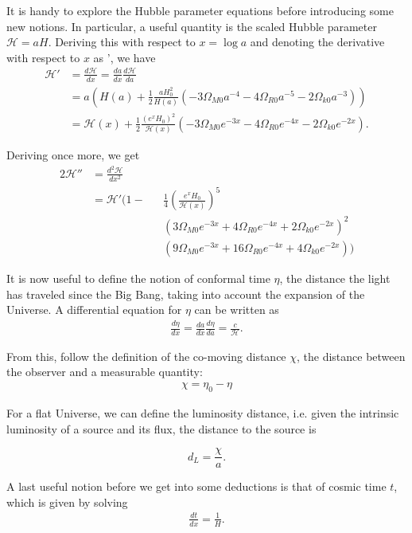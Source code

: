 \documentclass{aa}
\begin{document}
It is handy to explore the Hubble parameter equations before introducing some new notions. In particular, a useful quantity is the scaled Hubble parameter $\mathcal H = aH$. Deriving this with respect to $x = \log a$ and denoting the derivative with respect to $x$ as ', we have
\begin{align}
    \mathcal H' &= \frac{d\mathcal H}{dx} = \frac{da}{dx}\frac{d\mathcal H}{da}\\ 
    &= a\left( H(a) + \frac{1}{2}\frac{aH_0^2}{ H(a)} (-3\Omega_{M0} a^{-4} - 4\Omega_{R0}a^{-5}-2\Omega_{k0}a^{-3})\right)\\
    &= \mathcal H(x) +\frac{1}{2}\frac{(e^xH_0)^2}{\mathcal H(x)}(-3\Omega_{M0} e^{-3x} - 4 \Omega_{R0}e^{-4x}-2\Omega_{k0}e^{-2x}).
\end{align}

Deriving once more, we get
\begin{alignat*}{2}
    \mathcal H'' &= \frac{d^2\mathcal H}{dx^2}&&\\ 
    &= \mathcal H'\Bigg(1-&&\frac{1}{4}\left(\frac{e^xH_0}{\mathcal H(x)}\right)^5\\
    & &&(3\Omega_{M0}e^{-3x}+4\Omega_{R0}e^{-4x}+2\Omega_{k0}e^{-2x})^2\\
    & &&(9\Omega_{M0}e^{-3x}+16\Omega_{R0}e^{-4x}+4\Omega_{k0}e^{-2x})\Bigg)
\end{alignat*}

It is now useful to define the notion of conformal time $\eta$, the distance the light has traveled since the Big Bang, taking into account the expansion of the Universe. A differential equation for $\eta$ can be written as
\begin{align}
\frac{d\eta}{dx} = \frac{da}{dx}\frac{d\eta}{da} = \frac{c}{\mathcal{H}}.
\end{align}

From this, follow the definition of the co-moving distance $\chi$, the distance between the observer and a measurable quantity:
\begin{align}
\chi = \eta_0 - \eta
\end{align}

For a flat Universe, we can define the luminosity distance, i.e. given the intrinsic luminosity of a source and its flux, the distance to the source is

\begin{equation}
    d_L = \frac{\chi}{a}.
\end{equation}

A last useful notion before we get into some deductions is that of cosmic time $t$, which is given by solving
\begin{align}
\label{eq:t-ode}
\frac{dt}{dx} = \frac{1}{H}.
\end{align}
\end{document}
